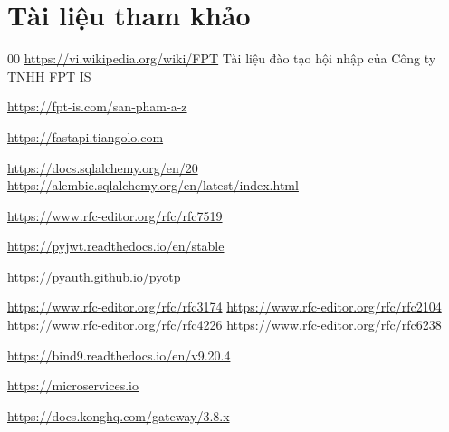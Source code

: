 
\newpage
{\centering \section*{Tài liệu tham khảo}}

\begin{thebibliography}{00}
     \url{https://vi.wikipedia.org/wiki/FPT}
     Tài liệu đào tạo hội nhập của Công ty TNHH FPT IS

     \url{https://fpt-is.com/san-pham-a-z}

     \url{https://fastapi.tiangolo.com}

     \url{https://docs.sqlalchemy.org/en/20}
     \url{https://alembic.sqlalchemy.org/en/latest/index.html}

     \url{https://www.rfc-editor.org/rfc/rfc7519}

     \url{https://pyjwt.readthedocs.io/en/stable}

     \url{https://pyauth.github.io/pyotp}

     \url{https://www.rfc-editor.org/rfc/rfc3174}
     \url{https://www.rfc-editor.org/rfc/rfc2104}
     \url{https://www.rfc-editor.org/rfc/rfc4226}
     \url{https://www.rfc-editor.org/rfc/rfc6238}

     \url{https://bind9.readthedocs.io/en/v9.20.4}

     \url{https://microservices.io}

     \url{https://docs.konghq.com/gateway/3.8.x}
\end{thebibliography}

